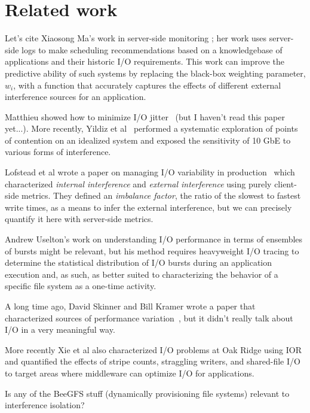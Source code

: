 \section{Related work} \label{sec:related}

  Let's cite Xiaosong Ma's work in server-side
monitoring \cite{Liu2016}; her work uses server-side logs to make scheduling
recommendations based on a knowledgebase of applications and their historic
I/O requirements.  This work can improve the predictive ability of such systems
by replacing the black-box weighting parameter, $w_{i}$, with a function that
accurately captures the effects of different external interference sources for
an application.

Matthieu showed how to minimize I/O jitter~\cite{Dorier2012} (but I haven't read
this paper yet...).  More recently, Yildiz et al~\cite{Yildiz2016} performed
a systematic exploration of points of contention on an idealized system and
exposed the sensitivity of 10 GbE to various forms of interference.

Lofstead et al wrote a paper on managing I/O variability in production~
\cite{Lofstead2010} which characterized \emph{internal interference} and
\emph{external interference} using purely client-side metrics.  They defined an
\emph{imbalance factor}, the ratio of the slowest to fastest write times, as a
means to infer the external interference, but we can precisely quantify it here
with server-side metrics.

Andrew Uselton's work on understanding I/O performance in terms of ensembles of
bursts might be relevant\cite{Uselton2010}, but his method requires heavyweight
I/O tracing to determine the statistical distribution of I/O bursts during an
application execution and, as such, as better suited to characterizing the
behavior of a specific file system as a one-time activity.

A long time ago, David Skinner and Bill Kramer wrote a paper that characterized
sources of performance variation~\cite{Skinner2005}, but it didn't really talk
about I/O in a very meaningful way.

More recently Xie et al also characterized I/O problems at Oak
Ridge\cite{Xie2012} using IOR and quantified the effects of stripe counts,
straggling writers, and shared-file I/O to target areas where middleware can
optimize I/O for applications.

Is any of the BeeGFS stuff (dynamically provisioning file systems) relevant to
interference isolation?


